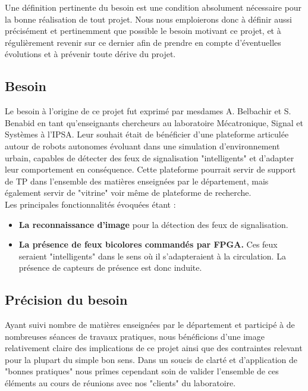 Une définition pertinente du besoin est une condition absolument nécessaire pour la bonne réalisation de tout projet. Nous nous emploierons donc à définir aussi précisément et pertinemment que possible le besoin motivant ce projet, et à régulièrement revenir sur ce dernier afin de prendre en compte d'éventuelles évolutions et à prévenir toute dérive du projet.

\subsection{Besoin}
Le besoin à l'origine de ce projet fut exprimé par mesdames A. Belbachir et S. Benabid en tant qu'enseignants chercheurs au laboratoire Mécatronique, Signal et Systèmes à l'IPSA. Leur souhait était de bénéficier d'une plateforme articulée autour de robots autonomes évoluant dans une simulation d’environnement urbain, capables de détecter des feux de signalisation "intelligents" et d'adapter leur comportement en conséquence. Cette plateforme pourrait servir de support de TP dans l'ensemble des matières enseignées par le département, mais également servir de "vitrine" voir même de plateforme de recherche.\\

Les principales fonctionnalités évoquées étant :
\begin{itemize}
	\item \textbf{La reconnaissance d'image} pour la détection des feux de signalisation.
	\item \textbf{La présence de feux bicolores commandés par FPGA.} Ces feux seraient "intelligents" dans le sens où il s'adapteraient à la circulation. La présence de capteurs de présence est donc induite.
\end{itemize}

\subsection{Précision du besoin}

Ayant suivi nombre de matières enseignées par le département et participé à de nombreuses séances de travaux pratiques, nous bénéficions d'une image relativement claire des implications de ce projet ainsi que des contraintes relevant pour la plupart du simple bon sens.
Dans un soucis de clarté et d'application de "bonnes pratiques" nous prîmes cependant soin de valider l'ensemble de ces éléments au cours de réunions avec nos "clients" du laboratoire.\\

